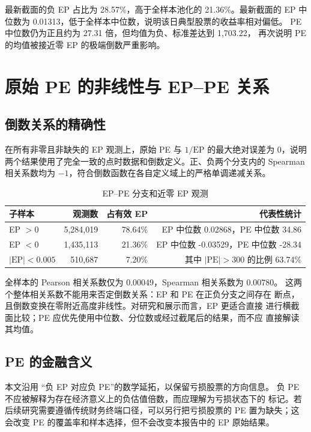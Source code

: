 \documentclass[UTF8,a4paper,11pt]{ctexart}
\newcommand{\EP}{\mathrm{EP}}
\newcommand{\PE}{\mathrm{PE}}
\begin{document}
最新截面的负 EP 占比为 28.57\%，高于全样本池化的 21.36\%。最新截面的
EP 中位数为 0.01313，低于全样本中位数，说明该日典型股票的收益率相对偏低。
PE 中位数仍为正且约为 27.31 倍，但均值为负、标准差达到 1,703.22，
再次说明 PE 的均值被接近零 EP 的极端倒数严重影响。

\section{原始 PE 的非线性与 EP--PE 关系}

\subsection{倒数关系的精确性}

在所有非零且非缺失的 EP 观测上，原始 PE 与 $1/\EP$ 的最大绝对误差为
0，说明两个结果使用了完全一致的点时数据和倒数定义。正、负两个分支内的
Spearman 相关系数均为 $-1$，符合倒数函数在各自定义域上的严格单调递减关系。

\begin{table}[H]
\centering
\caption{EP--PE 分支和近零 EP 观测}
\begin{tabular}{lrrr}
\toprule
子样本 & 观测数 & 占有效 EP & 代表性统计 \\
\midrule
EP $>0$ & 5,284,019 & 78.64\% & EP 中位数 0.02868，PE 中位数 34.86 \\
EP $<0$ & 1,435,113 & 21.36\% & EP 中位数 -0.03529，PE 中位数 -28.34 \\
$|\EP|<0.005$ & 510,687 & 7.20\% & 其中 $|\PE|>300$ 的比例 63.74\% \\
\bottomrule
\end{tabular}
\end{table}

全样本的 Pearson 相关系数仅为 0.00049，Spearman 相关系数为 0.00780。
这两个整体相关系数不能用来否定倒数关系：EP 和 PE 在正负分支之间存在
断点，且倒数变换在零附近高度非线性。对研究和展示而言，EP 更适合直接
进行横截面比较；PE 应优先使用中位数、分位数或经过截尾后的结果，而不应
直接解读其均值。

\subsection{PE 的金融含义}

本文沿用 \textquotedblleft 负 EP 对应负 PE\textquotedblright 的数学延拓，以保留亏损股票的方向信息。
负 PE 不应被解释为存在经济意义上的负估值倍数，而应理解为亏损状态下的
标记。若后续研究需要遵循传统财务终端口径，可以另行把亏损股票的 PE
置为缺失；这会改变 PE 的覆盖率和样本选择，但不会改变本报告中的 EP 原始结果。
\end{document}
